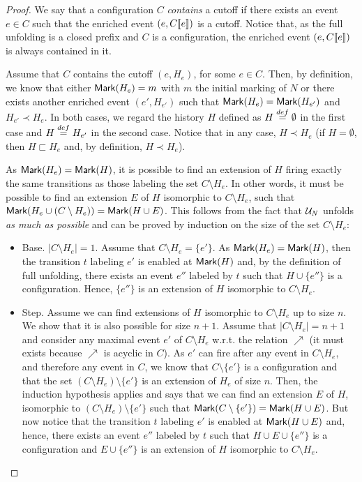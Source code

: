 \documentclass{article}
\begin{document}
\begin{proof}
We say that a configuration $C$ \emph{contains} a cutoff if there exists an
event $e \in C$ such that the enriched event $(e, C[\![ e]\!])$ is a cutoff.
Notice that, as the full unfolding is a closed prefix and $C$ is a
configuration, the enriched event $(e, C[\![ e]\!])$ is always contained in it.

Assume that $C$ contains the cutoff $(e, H_e)$, for some $e \in C$.  Then, by
definition, we know that either $\mathsf{Mark }{(H_e)} = m$ with $m$ the initial
marking of $N$ or there exists another enriched event $(e', H_{e'})$ such that
$\mathsf{Mark }{(H_e)} = \mathsf{Mark }{(H_{e'})}$ and $H_{e'} \prec H_e$.  In both cases,
we regard the history $H$ defined as $H \stackrel{def}{=} \emptyset$ in the first case
and $H \stackrel{def}{=} H_{e'}$ in the second case.  Notice that in any case, $H \prec
H_e$ (if $H = \emptyset$, then $H \sqsubset H_e$ and, by definition, $H \prec
H_e$).

As $\mathsf{Mark }{(H_e)} = \mathsf{Mark }{(H)}$, it is possible to find an extension of $H$
firing exactly the same transitions as those labeling the set $C \setminus
H_e$.  In other words, it must be possible to find an extension $E$ of $H$
isomorphic to $C \setminus H_e$, such that $\mathsf{Mark }{(H_e \cup (C \setminus
H_e))} = \mathsf{Mark }{(H \cup E)}$.  This follows from the fact that $\mathcal{U}_{N}$ unfolds
\emph{as much as possible} and can be proved by induction on the size of the
set $C \setminus H_e$:

\begin{itemize}
\item{Base}.  $|C \setminus H_e| = 1$.  Assume that $C \setminus H_e =
\{e'\}$.  As $\mathsf{Mark }{(H_e)} = \mathsf{Mark }{(H)}$, then the transition $t$ labeling
$e'$ is enabled at $\mathsf{Mark }{(H)}$ and, by the definition of full unfolding,
there exists an event $e''$ labeled by $t$ such that $H \cup \{e''\}$ is a
configuration.  Hence, $\{e''\}$ is an extension of $H$ isomorphic to $C
\setminus H_e$.

\item{Step}.  Assume we can find extensions of $H$ isomorphic to $C \setminus
H_e$ up to size $n$.  We show that it is also possible for size $n+1$.  Assume
that $|C \setminus H_e| = n + 1$ and consider any maximal event $e'$ of $C
\setminus H_e$ w.r.t. the relation $\nearrow$ (it must exists because
$\nearrow$ is acyclic in $C$).  As $e'$ can fire after any event in $C
\setminus H_e$, and therefore any event in $C$, we know that $C \setminus
\{e'\}$ is a configuration and that the set $(C \setminus H_e) \setminus
\{e'\}$ is an extension of $H_e$ of size $n$.  Then, the induction hypothesis
applies and says that we can find an extension $E$ of $H$, isomorphic to $(C
\setminus H_e) \setminus \{e'\}$ such that $\mathsf{Mark }{(C \setminus \{e'\})} =
\mathsf{Mark }{(H \cup E)}$.  But now notice that the transition $t$ labeling $e'$ is
enabled at $\mathsf{Mark }{(H \cup E)}$ and, hence, there exists an event $e''$ labeled
by $t$ such that $H \cup E \cup \{e''\}$ is a configuration and $E \cup
\{e''\}$ is an extension of $H$ isomorphic to $C \setminus H_e$.  \end{itemize}


\end{proof}
\end{document}
